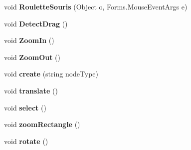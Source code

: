 \begin{DoxyCompactItemize}
\item 
\hypertarget{class_interface_graphique_1_1_editor_controller_a2d2f01230ad526588cc7ad4d7d0654e3}{}void {\bfseries Roulette\+Souris} (Object o, Forms.\+Mouse\+Event\+Args e)\label{class_interface_graphique_1_1_editor_controller_a2d2f01230ad526588cc7ad4d7d0654e3}

\item 
\hypertarget{class_interface_graphique_1_1_editor_controller_ada1b0f4f1183faf2d66a4be4a453da24}{}void {\bfseries Detect\+Drag} ()\label{class_interface_graphique_1_1_editor_controller_ada1b0f4f1183faf2d66a4be4a453da24}

\item 
\hypertarget{class_interface_graphique_1_1_editor_controller_a1c406b266f2129d9199072e5ae866621}{}void {\bfseries Zoom\+In} ()\label{class_interface_graphique_1_1_editor_controller_a1c406b266f2129d9199072e5ae866621}

\item 
\hypertarget{class_interface_graphique_1_1_editor_controller_a94cbbf18cacc71bbca978c9166fe36ee}{}void {\bfseries Zoom\+Out} ()\label{class_interface_graphique_1_1_editor_controller_a94cbbf18cacc71bbca978c9166fe36ee}

\item 
\hypertarget{class_interface_graphique_1_1_editor_controller_a8bd73634e07d893c4c352b5e84643401}{}void {\bfseries create} (string node\+Type)\label{class_interface_graphique_1_1_editor_controller_a8bd73634e07d893c4c352b5e84643401}

\item 
\hypertarget{class_interface_graphique_1_1_editor_controller_a43f1e04a48e49d9ced5d0059952a5d69}{}void {\bfseries translate} ()\label{class_interface_graphique_1_1_editor_controller_a43f1e04a48e49d9ced5d0059952a5d69}

\item 
\hypertarget{class_interface_graphique_1_1_editor_controller_a72358ea2ef1b5f6e747a2f2559152236}{}void {\bfseries select} ()\label{class_interface_graphique_1_1_editor_controller_a72358ea2ef1b5f6e747a2f2559152236}

\item 
\hypertarget{class_interface_graphique_1_1_editor_controller_aa4a297885c6a81332c9516b11388f377}{}void {\bfseries zoom\+Rectangle} ()\label{class_interface_graphique_1_1_editor_controller_aa4a297885c6a81332c9516b11388f377}

\item 
\hypertarget{class_interface_graphique_1_1_editor_controller_ac6b23da8b8749616b321af6c7ed4f536}{}void {\bfseries rotate} ()\label{class_interface_graphique_1_1_editor_controller_ac6b23da8b8749616b321af6c7ed4f536}


\end{DoxyCompactItemize}
